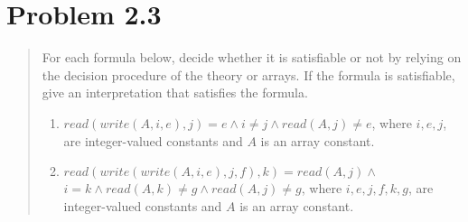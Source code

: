 \documentclass[11pt,a4paper]{article}
\begin{document}
\section*{Problem 2.3}
\begin{quote}
For each formula below, decide whether it is satisfiable or not by relying on
the decision procedure of the theory or arrays. If the formula is satisfiable, give an interpretation that satisfies the formula.
\begin{enumerate}
\item $read(write(A, i, e), j) = e \land i \neq j \land read(A, j) \neq e$,
where $i, e, j$, are integer-valued constants and $A$ is an array constant.
\item $read(write(write(A, i, e), j, f ), k) = read(A, j) \land$ \\
$ i = k \land read(A, k) \neq g \land read(A, j) \neq g$,
where $i, e, j, f, k, g$, are integer-valued constants and $A$ is an array constant.
\end{enumerate}
\end{quote}
\end{document}
